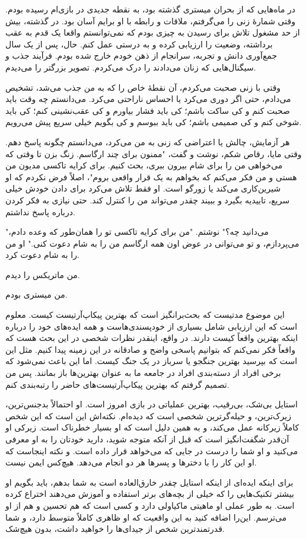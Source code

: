 در ماه‌هایی که از بحران میستری گذشته بود، به نقطه جدیدی در بازی‌ام رسیده بودم. وقتی شمارۀ زنی را می‌گرفتم، ملاقات و رابطه با او برایم آسان بود. در گذشته، بیش از حد مشغول تلاش برای رسیدن به چیزی بودم که نمی‌توانستم واقعا یک قدم به عقب برداشته، وضعیت را ارزیابی کرده و به درستی عمل کنم. حال، پس از یک سال جمع‌آوری دانش و تجربه، سرانجام از ذهن خودم خارج شده بودم. فرآیند جذب و سیگنال‌هایی که زنان می‌دادند را درک می‌کردم. تصویر بزرگتر را می‌دیدم.

وقتی با زنی صحبت می‌کردم، آن نقطۀ خاص را که به من جذب می‌شد، تشخیص می‌دادم، حتی اگر دوری می‌کرد یا احساس ناراحتی می‌کرد. می‌دانستم چه وقت باید صحبت کنم و کی ساکت باشم؛ کی باید فشار بیاورم و کی عقب‌نشینی کنم؛ کی باید شوخی کنم و کی صمیمی باشم؛ کی باید ببوسم و کی بگویم خیلی سریع پیش می‌رویم.

هر آزمایش، چالش یا اعتراضی که زنی به من می‌کرد، می‌دانستم چگونه پاسخ دهم. وقتی مایا، رقاص شکم، نوشت و گفت، "ممنون برای چند ارگاسم. زنگ بزن تا وقتی که می‌خواهی من را برای شام بیرون ببری، بحث کنیم. برای کرایه تاکسی مدیون من هستی و من فکر می‌کنم که بخواهم به یک قرار واقعی بروم"، اصلاً فرض نکردم که او شیرین‌کاری می‌کند یا زورگو است. او فقط تلاش می‌کرد برای دادن خودش خیلی سریع، تاییدیه بگیرد و ببیند چقدر می‌تواند من را کنترل کند. حتی نیازی به فکر کردن درباره پاسخ نداشتم.

"می‌دانید چه؟" نوشتم. "من برای کرایه تاکسی تو را همان‌طور که وعده دادم، می‌پردازم، و تو می‌توانی در عوض اون همه ارگاسم من را به شام دعوت کنی." او من را به شام دعوت کرد.

من ماتریکس را دیدم.

من میستری بودم.

این موضوع مدتیست که بحث‌برانگیز است که بهترین پیکاپ‌آرتیست کیست. معلوم است که این ارزیابی شامل بسیاری از خودپسندی‌هاست و همه ایده‌های خود را درباره اینکه بهترین واقعاً کیست دارند. در واقع، اینقدر نظرات شخصی در این بحث هست که واقعاً فکر نمی‌کنم که بتوانیم پاسخی واضح و صادقانه در این زمینه پیدا کنیم. مثل این است که بپرسید بهترین جنگجو یا سرباز در یک جنگ کیست. اما این باعث نمی‌شود که برخی افراد از دسته‌بندی افراد در جامعه ما به عنوان بهترین‌ها باز بمانند. پس من تصمیم گرفتم که بهترین پیکاپ‌آرتیست‌های حاضر را رتبه‌بندی کنم.

استایل بی‌شک، بی‌رقیب، بهترین عملیاتی در بازی امروز است. او احتمالاً بدجنس‌ترین، زیرک‌ترین، و حیله‌گرترین شخصی است که دیده‌ام. نکته‌اش این است که این شخص کاملاً زیرکانه عمل می‌کند، و به همین دلیل است که او بسیار خطرناک است. زیرکی او آن‌قدر شگفت‌انگیز است که قبل از آنکه متوجه شوید، دارید خودتان را به او معرفی می‌کنید و او شما را درست در جایی که می‌خواهد قرار داده است. و نکته اینجاست که او این کار را با دخترها و پسرها هر دو انجام می‌دهد. هیچ‌کس ایمن نیست.

برای اینکه ایده‌ای از اینکه استایل چقدر خارق‌العاده است به شما بدهم، باید بگویم او بیشتر تکنیک‌هایی را که خیلی از بچه‌های برتر استفاده و آموزش می‌دهند اختراع کرده است. به طور عملی او ماهیتی ماکیاولی دارد و کسی است که هم تحسین و هم از او می‌ترسم. این‌را اضافه کنید به این واقعیت که او ظاهری کاملاً متوسط دارد، و شما قدرتمندترین شخص از جیدای‌ها را خواهید داشت، بدون هیچ‌شک.